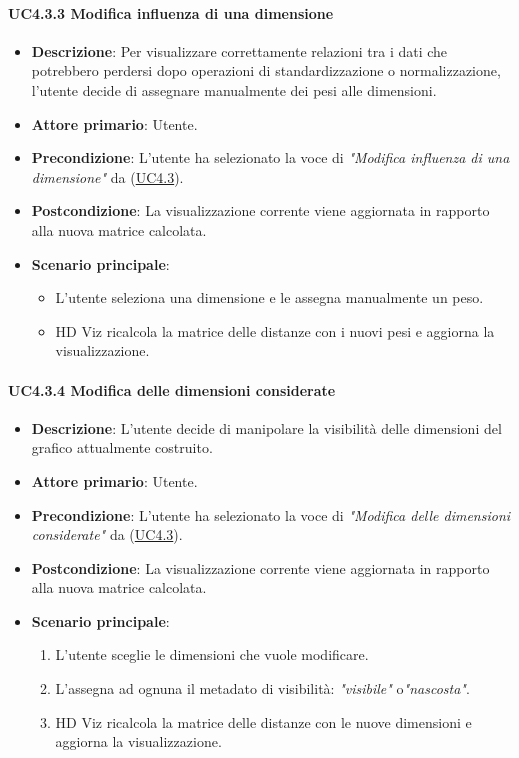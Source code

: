\paragraph{UC4.3.3 Modifica influenza di una dimensione}
\label{par:uc4.3.3}
\begin{itemize}
    \item \textbf{Descrizione}: Per visualizzare correttamente relazioni tra i dati che 
                                potrebbero perdersi dopo operazioni di standardizzazione o normalizzazione,
                                l’utente decide di assegnare manualmente dei pesi alle dimensioni.

    \item \textbf{Attore primario}: Utente.
    \item \textbf{Precondizione}: L'utente ha selezionato la voce di \emph{"Modifica influenza di una dimensione"} da (\hyperref[ssub:uc4.3]{UC4.3}).

    \item \textbf{Postcondizione}: La visualizzazione corrente viene aggiornata in rapporto alla nuova matrice calcolata.
    \item \textbf{Scenario principale}:  
    \begin{itemize}
        \item L’utente seleziona una dimensione e le assegna manualmente un peso.
        \item HD Viz ricalcola la matrice delle distanze con i nuovi pesi e aggiorna la visualizzazione.
    \end{itemize}
\end{itemize}

\paragraph{UC4.3.4 Modifica delle dimensioni considerate}
\label{par:uc4.3.4}
\begin{itemize}
    \item \textbf{Descrizione}: L'utente decide di manipolare la visibilità delle dimensioni 
                                del grafico attualmente costruito.
    \item \textbf{Attore primario}: Utente.
    \item \textbf{Precondizione}: L'utente ha selezionato la voce di \emph{"Modifica delle dimensioni considerate"} da (\hyperref[ssub:uc4.3]{UC4.3}).
    \item \textbf{Postcondizione}: La visualizzazione corrente viene aggiornata in rapporto alla nuova matrice calcolata.
    \item \textbf{Scenario principale}:
    \begin{enumerate}
        \item L'utente sceglie le dimensioni che vuole modificare. 
        \item L'assegna ad ognuna il metadato di visibilità: \emph{"visibile"} o\emph{"nascosta"}.
        \item HD Viz ricalcola la matrice delle distanze con le nuove dimensioni e aggiorna la visualizzazione.
    \end{enumerate}
\end{itemize}

